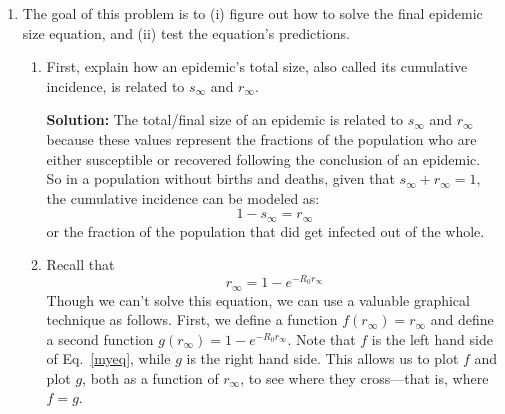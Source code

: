\documentclass[11pt]{article}
\newenvironment{solution}{\par\noindent\begingroup\color{BrickRed}\textbf{Solution:} }{\par\endgroup}
\begin{document}
\begin{enumerate}
\begin{enumerate}[label=\alph*.]
	\item Use your results to explain how the recovery rate $\gamma$ is related to the typical amount of time a person remains infectious.
		\begin{solution} \newline \newline
			If $E[X] = \frac{1}{\gamma}$ can be used to model the typical amount of time a person stays infected for,
			then $\gamma$ must be the inverse of the expected duration of infection. \\
			Assuming that time steps are measured in days, \\
			if $\gamma$ is say $2$, then the expected duration of infection is just half of a day. \\
			Conversely, if $\gamma$ is $0.5$, then the expected duration of infection is $2$ whole days. \\
			So the larger the recovery rate $\gamma$, the shorter the expected duration of infection. \\
			This is somewhat intuitive.
		\end{solution}
\end{enumerate}

\clearpage

\item The goal of this problem is to 
	  (i) figure out how to solve the final epidemic size equation, and 
	  (ii) test the equation's predictions.

	\begin{enumerate}[label=\alph*.]
		\item First, explain how an epidemic's total size, also called its cumulative incidence, is related to $s_\infty$ and $r_\infty$. 
			\begin{solution} \newline \newline
				The total/final size of an epidemic is related to $s_\infty$ and $r_\infty$ because these values represent the fractions
				of the population who are either susceptible or recovered following the conclusion of an epidemic. \\
				So in a population without births and deaths, given that $s_\infty + r_\infty = 1$,
				the cumulative incidence can be modeled as:
				$$1 - s_\infty = r_\infty$$
				or the fraction of the population that did get infected out of the whole.
			\end{solution}
		\item Recall that 
		\begin{equation}r_\infty = 1-e^{-R_0 r_\infty}\label{myeq}\end{equation} 
		Though we can't solve this equation, we can use a valuable graphical technique as follows. 
		First, we define a function $f(r_\infty) = r_\infty$ and define a second function $g(r_\infty) = 1-e^{-R_0 r_\infty}$. 
		Note that $f$ is the left hand side of Eq.~\eqref{myeq}, while $g$ is the right hand side. 
		This allows us to plot $f$ and plot $g$, both as a function of $r_\infty$, to see where they cross---that is, where $f=g$. 
		

\end{enumerate}
\end{enumerate}
\end{document}
